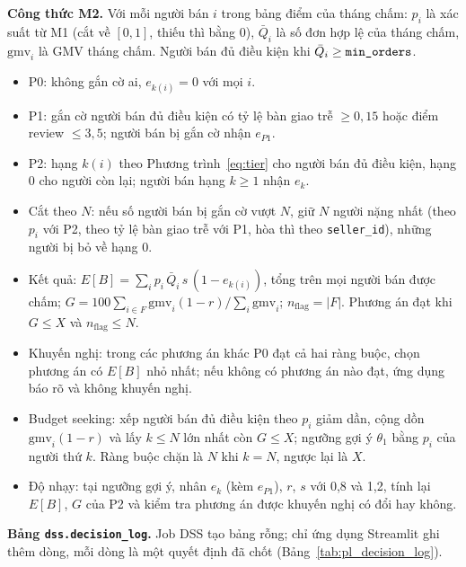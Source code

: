 \documentclass[a4paper]{article}
\begin{document}
\textbf{Công thức M2.} Với mỗi người bán $i$ trong bảng điểm của tháng chấm: $p_i$ là xác suất từ M1 (cắt về $[0, 1]$, thiếu thì bằng 0), $\bar{Q}_i$ là số đơn hợp lệ của tháng chấm, $\text{gmv}_i$ là GMV tháng chấm. Người bán đủ điều kiện khi $\bar{Q}_i \ge \texttt{min\_\allowbreak{}orders}$.
\begin{itemize}
  \item P0: không gắn cờ ai, $e_{k(i)} = 0$ với mọi $i$.
  \item P1: gắn cờ người bán đủ điều kiện có tỷ lệ bàn giao trễ $\ge 0{,}15$ hoặc điểm review $\le 3{,}5$; người bán bị gắn cờ nhận $e_{P1}$.
  \item P2: hạng $k(i)$ theo Phương trình~\eqref{eq:tier} cho người bán đủ điều kiện, hạng 0 cho người còn lại; người bán hạng $k \ge 1$ nhận $e_k$.
  \item Cắt theo $N$: nếu số người bán bị gắn cờ vượt $N$, giữ $N$ người nặng nhất (theo $p_i$ với P2, theo tỷ lệ bàn giao trễ với P1, hòa thì theo \texttt{seller\_\allowbreak{}id}), những người bị bỏ về hạng 0.
  \item Kết quả: $E[B] = \sum_i p_i \, \bar{Q}_i \, s \, (1 - e_{k(i)})$, tổng trên mọi người bán được chấm; $G = 100 \sum_{i \in F} \text{gmv}_i (1 - r) / \sum_i \text{gmv}_i$; $n_{\text{flag}} = |F|$. Phương án đạt khi $G \le X$ và $n_{\text{flag}} \le N$.
  \item Khuyến nghị: trong các phương án khác P0 đạt cả hai ràng buộc, chọn phương án có $E[B]$ nhỏ nhất; nếu không có phương án nào đạt, ứng dụng báo rõ và không khuyến nghị.
  \item Budget seeking: xếp người bán đủ điều kiện theo $p_i$ giảm dần, cộng dồn $\text{gmv}_i (1 - r)$ và lấy $k \le N$ lớn nhất còn $G \le X$; ngưỡng gợi ý $\theta_1$ bằng $p_i$ của người thứ $k$. Ràng buộc chặn là $N$ khi $k = N$, ngược lại là $X$.
  \item Độ nhạy: tại ngưỡng gợi ý, nhân $e_k$ (kèm $e_{P1}$), $r$, $s$ với 0,8 và 1,2, tính lại $E[B]$, $G$ của P2 và kiểm tra phương án được khuyến nghị có đổi hay không.
\end{itemize}

\textbf{Bảng \texttt{dss.decision\_\allowbreak{}log}.} Job DSS tạo bảng rỗng; chỉ ứng dụng Streamlit ghi thêm dòng, mỗi dòng là một quyết định đã chốt (Bảng~\ref{tab:pl_decision_log}).
\end{document}
